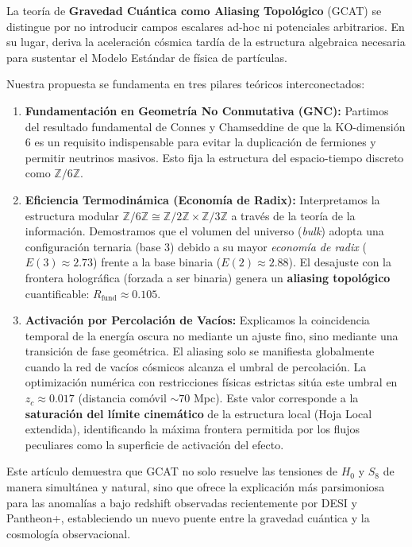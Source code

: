 \documentclass[12pt, a4paper]{article}
\theoremstyle{plain}
\theoremstyle{definition}
\begin{document}
La teoría de \textbf{Gravedad Cuántica como Aliasing Topológico} (GCAT) se distingue por no introducir campos escalares ad-hoc ni potenciales arbitrarios. En su lugar, deriva la aceleración cósmica tardía de la estructura algebraica necesaria para sustentar el Modelo Estándar de física de partículas.

Nuestra propuesta se fundamenta en tres pilares teóricos interconectados:

\begin{enumerate}
    \item \textbf{Fundamentación en Geometría No Conmutativa (GNC):} Partimos del resultado fundamental de Connes y Chamseddine \cite{Connes2008} de que la KO-dimensión 6 es un requisito indispensable para evitar la duplicación de fermiones y permitir neutrinos masivos. Esto fija la estructura del espacio-tiempo discreto como $\mathbb{Z}/6\mathbb{Z}$.
    
    \item \textbf{Eficiencia Termodinámica (Economía de Radix):} Interpretamos la estructura modular $\mathbb{Z}/6\mathbb{Z} \cong \mathbb{Z}/2\mathbb{Z} \times \mathbb{Z}/3\mathbb{Z}$ a través de la teoría de la información. Demostramos que el volumen del universo (\textit{bulk}) adopta una configuración ternaria (base 3) debido a su mayor \textit{economía de radix} ($E(3) \approx 2.73$) frente a la base binaria ($E(2) \approx 2.88$). El desajuste con la frontera holográfica (forzada a ser binaria) genera un \textbf{aliasing topológico} cuantificable: $R_{\text{fund}} \approx 0.105$.
    
    \item \textbf{Activación por Percolación de Vacíos:} Explicamos la coincidencia temporal de la energía oscura no mediante un ajuste fino, sino mediante una transición de fase geométrica. El aliasing solo se manifiesta globalmente cuando la red de vacíos cósmicos alcanza el umbral de percolación. La optimización numérica con restricciones físicas estrictas sitúa este umbral en $z_c \approx 0.017$ (distancia comóvil $\sim 70$ Mpc). Este valor corresponde a la \textbf{saturación del límite cinemático} de la estructura local (Hoja Local extendida), identificando la máxima frontera permitida por los flujos peculiares como la superficie de activación del efecto.
\end{enumerate}

Este artículo demuestra que GCAT no solo resuelve las tensiones de $H_0$ y $S_8$ de manera simultánea y natural, sino que ofrece la explicación más parsimoniosa para las anomalías a bajo redshift observadas recientemente por DESI y Pantheon+, estableciendo un nuevo puente entre la gravedad cuántica y la cosmología observacional.
\end{document}
